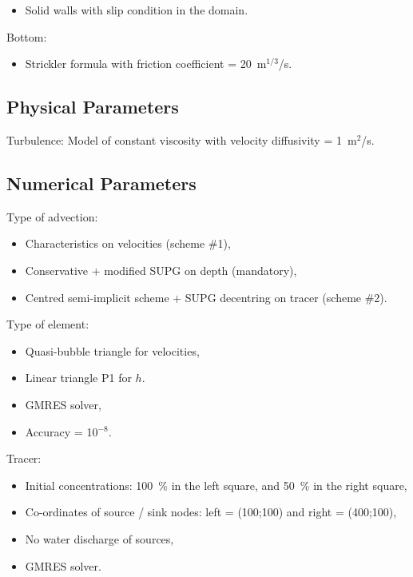 \begin{itemize}
\item Solid walls with slip condition in the domain.
\end{itemize}

Bottom:

\begin{itemize}
\item Strickler formula with friction coefficient = 20~m$^{1/3}$/s.
\end{itemize}

\subsection{Physical Parameters}

Turbulence: Model of constant viscosity with velocity diffusivity = 1~m$^2$/s.

\subsection{Numerical Parameters}

Type of advection:
\begin{itemize}
\item Characteristics on velocities (scheme \#1),
\item Conservative + modified SUPG on depth (mandatory),
\item Centred semi-implicit scheme + SUPG decentring on tracer (scheme \#2).
\end{itemize}

Type of element:
\begin{itemize}
\item Quasi-bubble triangle for velocities,
\item Linear triangle P1 for $h$.
\end{itemize}

\begin{itemize}
\item GMRES solver,
\item Accuracy = 10$^{-8}$.
\end{itemize}

Tracer:

\begin{itemize}
\item Initial concentrations: 100~\% in the left square, and 50~\% in the right square,
\item Co-ordinates of source / sink nodes: left = (100;100) and right = (400;100),
\item No water discharge of sources,
\item GMRES solver.
\end{itemize}


